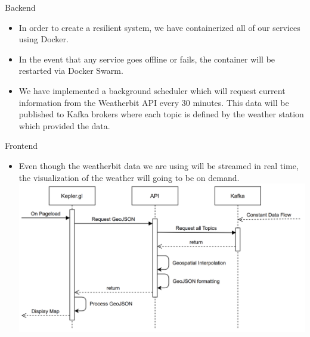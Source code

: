 \documentclass{beamer}
\begin{document}
\begin{frame}{Backend}
\begin{itemize}
    \item In order to create a resilient system, we have containerized all of our services using Docker. 
    \item In the event that any service goes offline or fails, the container will be restarted via Docker Swarm. 
    \item We have implemented a background scheduler which will request current information from the Weatherbit API every 30 minutes. This data will be published to Kafka brokers where each topic is defined by the weather station which provided the data. 
\end{itemize}
\end{frame}

\begin{frame}{Frontend}
\begin{itemize}
    \item Even though the weatherbit data we are using will be streamed in real time, the  visualization of the weather will going to be on demand. 
    \includegraphics[width=.9\linewidth]{figures/Frontend_Flow.png}
\end{itemize}
\end{frame}
\end{document}
